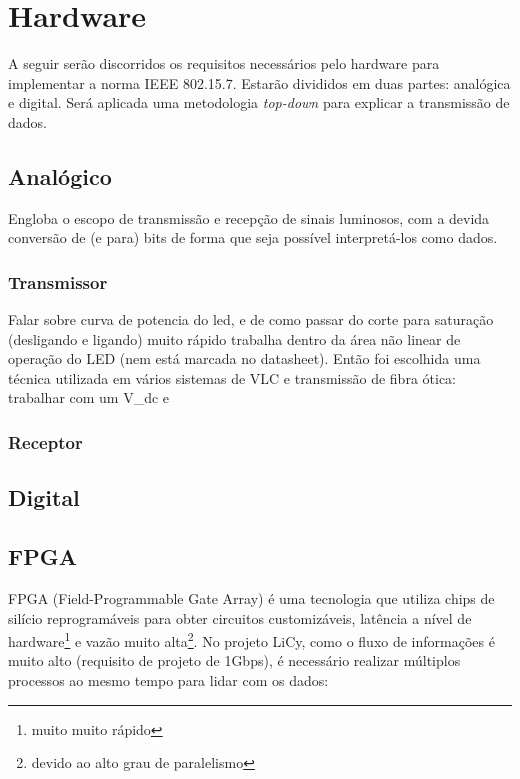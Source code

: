 	\section{Hardware}\label{sec-hardware}
	
	A seguir serão discorridos os requisitos necessários pelo hardware para implementar a norma IEEE 802.15.7. Estarão divididos em duas partes: analógica e digital. Será aplicada uma metodologia \textit{top-down} para explicar a transmissão de dados.
	
	\subsection{Analógico}
	
	Engloba o escopo de transmissão e recepção de sinais luminosos, com a devida conversão de (e para) bits de forma que seja possível interpretá-los como dados.
	
	\subsubsection{Transmissor}
	
	Falar sobre curva de potencia do led, e de como passar do corte para saturação (desligando e ligando) muito rápido trabalha dentro da área não linear de operação do LED (nem está marcada no datasheet). Então foi escolhida uma técnica utilizada em vários sistemas de VLC e transmissão de fibra ótica: trabalhar com um V_{dc} e 
	
	\subsubsection{Receptor}
	
	\subsection{Digital}

	\subsection{FPGA}\label{hard-fpga}
	
	FPGA (Field-Programmable Gate Array) é uma tecnologia que utiliza chips de silício reprogramáveis para obter circuitos customizáveis, latência a nível de hardware\footnote{muito muito rápido} e vazão muito alta\footnote{devido ao alto grau de paralelismo}. No projeto LiCy, como o fluxo de informações é muito alto (requisito de projeto de 1Gbps), é necessário realizar múltiplos processos ao mesmo tempo para lidar com os dados:
	
